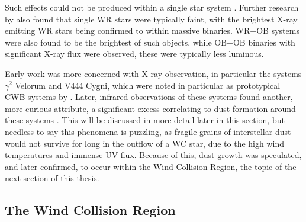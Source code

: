 \noindent
Such effects could not be produced within a single star system \parencite{pittard_x-ray_1999}.
Further research by \textcite{pollockEinsteinViewWolfRayet1987} also found that single WR stars were typically faint, with the brightest X-ray emitting WR stars being confirmed to within massive binaries.
WR+OB systems were also found to be the brightest of such objects, while OB+OB binaries with significant X-ray flux were observed, these were typically less luminous.


Early work was more concerned with X-ray observation, in particular the systems $\gamma^2$ Velorum and V444 Cygni, which were noted in particular as prototypical CWB systems by \textcite{prilutskii_x_1976}.
Later, infrared observations of these systems found another, more curious attribute, a significant excess correlating to dust formation around these systems \parencite{williamsInfraredPhotometryLatetype1987}.
This will be discussed in more detail later in this section, but needless to say this phenomena is puzzling, as fragile grains of interstellar dust would not survive for long in the outflow of a WC star, due to the high wind temperatures and immense UV flux.
Because of this, dust growth was speculated, and later confirmed, to occur within the Wind Collision Region, the topic of the next section of this thesis.

\subsection{The Wind Collision Region}
\label{sec:wcr}

